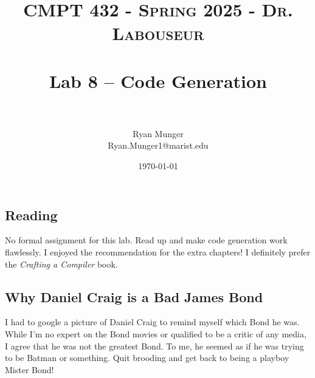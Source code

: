 \documentclass[letterpaper, 10pt]{article}
\title{	
   \normalfont \normalsize 
   \textsc{CMPT 432 - Spring 2025 - Dr. Labouseur} \\[10pt] %
   \horrule{0.5pt} \\[0.25cm] 	%
   \huge Lab 8 -- Code Generation \\     	    %
   \horrule{0.5pt} \\[0.25cm] 	%
}
\author{Ryan Munger \\ \normalsize Ryan.Munger1@marist.edu}
\date{\normalsize\today} 	%
\begin{document}
\maketitle %


\vspace{-.7cm}

\subsection{Reading}
No formal assignment for this lab. Read up and make code generation work flawlessly. I enjoyed the recommendation for the extra chapters! I definitely prefer the \textit{Crafting a Compiler} book. 

\subsection{Why Daniel Craig is a Bad James Bond}
I had to google a picture of Daniel Craig to remind myself which Bond he was. While I'm no expert on the Bond movies or qualified to be a critic of any media, I agree that he was not the greatest Bond. To me, he seemed as if he was trying to be Batman or something. Quit brooding and get back to being a playboy Mister Bond!
\end{document}
